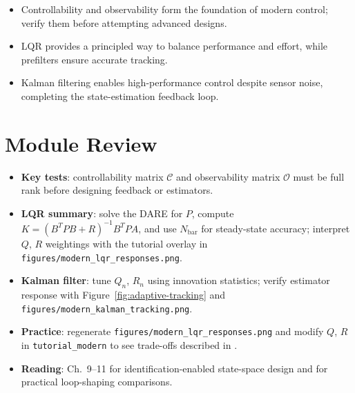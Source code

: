 \begin{takeaway}
\begin{itemize}[leftmargin=*]
    \item Controllability and observability form the foundation of modern control; verify them before attempting advanced designs.
    \item LQR provides a principled way to balance performance and effort, while prefilters ensure accurate tracking.
    \item Kalman filtering enables high-performance control despite sensor noise, completing the state-estimation feedback loop.
\end{itemize}
\end{takeaway}

\section{Module Review}
\begin{itemize}[leftmargin=*]
    \item \textbf{Key tests}: controllability matrix $\mathcal{C}$ and observability matrix $\mathcal{O}$ must be full rank before designing feedback or estimators.
    \item \textbf{LQR summary}: solve the DARE for $P$, compute $K = (B^T P B + R)^{-1} B^T P A$, and use $N_{\text{bar}}$ for steady-state accuracy; interpret $Q$, $R$ weightings with the tutorial overlay in \texttt{figures/modern\_lqr\_responses.png}.
    \item \textbf{Kalman filter}: tune $Q_n$, $R_n$ using innovation statistics; verify estimator response with Figure~\ref{fig:adaptive-tracking} and \texttt{figures/modern\_kalman\_tracking.png}.
    \item \textbf{Practice}: regenerate \texttt{figures/modern\_lqr\_responses.png} and modify $Q$, $R$ in \texttt{tutorial\_modern} to see trade-offs described in \textcite{ljung2012control}.
    \item \textbf{Reading}: \textcite{ljung2012control} Ch.~9--11 for identification-enabled state-space design and \textcite{astrom2006advanced} for practical loop-shaping comparisons.
\end{itemize}

